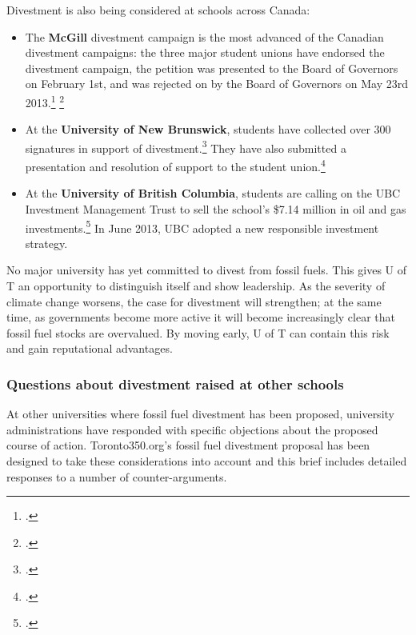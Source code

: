 \documentclass[10pt]{article}
\begin{document}
Divestment is also being considered at schools across Canada:
\begin{itemize}
	\item The \textbf{McGill} divestment campaign is the most advanced of the Canadian divestment campaigns: the three major student unions have endorsed the divestment campaign, the petition was presented to the Board of Governors on February 1st, and was rejected on by the Board of Governors on May 23rd 2013.\footcite[][]{McGillStudentExecs} \footcite[][]{McGillDelivers}
	\item At the \textbf{University of New Brunswick}, students have collected over 300 signatures in support of divestment.\footcite[][]{UNBPetition} They have also submitted a presentation and resolution of support to the student union.\footcite[][]{UNBStudentUnion}
	\item At the \textbf{University of British Columbia}, students are calling on the UBC Investment Management Trust to sell the school's \$7.14 million in oil and gas investments.\footcite[][]{UBCDivest} In June 2013, UBC adopted a new responsible investment strategy.
\end{itemize}



No major university has yet committed to divest from fossil fuels.
This gives U of T an opportunity to distinguish itself and show leadership.
As the severity of climate change worsens, the case for divestment will strengthen; at the same time, as governments become more active it will become increasingly clear that fossil fuel stocks are overvalued.
By moving early, U of T can contain this risk and gain reputational advantages.



\subsubsection{Questions about divestment raised at other schools}



At other universities where fossil fuel divestment has been proposed, university administrations have responded with specific objections about the proposed course of action.
Toronto350.org's fossil fuel divestment proposal has been designed to take these considerations into account and this brief includes detailed responses to a number of counter-arguments.
\end{document}

